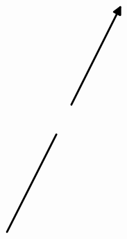 \documentclass[10pt]{article}
\theoremstyle{plain}
\theoremstyle{remark}
\begin{document}
\[\begin{pgfpicture}
\begin{pgfscope}
\pgfpathlineto{\pgfqpoint{3.210150in}{3.618203in}}%
\pgfpathlineto{\pgfqpoint{3.120593in}{3.573710in}}%
\pgfpathclose%
\pgfusepath{stroke,fill}%
\end{pgfscope}%
\begin{pgfscope}%
\pgfpathrectangle{\pgfqpoint{0.224216in}{0.187957in}}{\pgfqpoint{3.754528in}{5.640000in}} %
\pgfusepath{clip}%
\pgfsetroundcap%
\pgfsetroundjoin%
\pgfsetlinewidth{2.007500pt}%
\definecolor{currentstroke}{rgb}{0.000000,0.000000,0.000000}%
\pgfsetstrokecolor{currentstroke}%
\pgfsetdash{}{0pt}%
\pgfpathmoveto{\pgfqpoint{1.313193in}{4.109878in}}%
\pgfpathquadraticcurveto{\pgfqpoint{1.667720in}{4.815670in}}{\pgfqpoint{2.008306in}{5.493710in}}%
\pgfusepath{stroke}%
\end{pgfscope}%
\begin{pgfscope}%
\pgfpathrectangle{\pgfqpoint{0.224216in}{0.187957in}}{\pgfqpoint{3.754528in}{5.640000in}} %
\pgfusepath{clip}%
\pgfsetroundcap%
\pgfsetroundjoin%
\definecolor{currentfill}{rgb}{0.000000,0.000000,0.000000}%
\pgfsetfillcolor{currentfill}%
\pgfsetlinewidth{2.007500pt}%
\definecolor{currentstroke}{rgb}{0.000000,0.000000,0.000000}%
\pgfsetstrokecolor{currentstroke}%
\pgfsetdash{}{0pt}%
\pgfpathmoveto{\pgfqpoint{1.918740in}{5.426793in}}%
\pgfpathlineto{\pgfqpoint{2.008306in}{5.493710in}}%
\pgfpathlineto{\pgfqpoint{2.008100in}{5.381906in}}%
\pgfpathlineto{\pgfqpoint{1.918740in}{5.426793in}}%
\pgfpathclose%
\pgfusepath{stroke,fill}%
\end{pgfscope}%
\begin{pgfscope}%
\pgfpathrectangle{\pgfqpoint{0.224216in}{0.187957in}}{\pgfqpoint{3.754528in}{5.640000in}} %
\pgfusepath{clip}%
\pgfsetroundcap%
\pgfsetroundjoin%
\pgfsetlinewidth{2.007500pt}%
\definecolor{currentstroke}{rgb}{0.000000,0.000000,0.000000}%
\pgfsetstrokecolor{currentstroke}%
\pgfsetdash{}{0pt}%
\pgfpathmoveto{\pgfqpoint{0.396704in}{2.301744in}}%
\pgfpathquadraticcurveto{\pgfqpoint{0.755055in}{3.007951in}}{\pgfqpoint{1.099353in}{3.686462in}}%
\pgfusepath{stroke}%
\end{pgfscope}%
\begin{pgfscope}%
\pgfpathrectangle{\pgfqpoint{0.224216in}{0.187957in}}{\pgfqpoint{3.754528in}{5.640000in}} %
\pgfusepath{clip}%
\pgfsetroundcap%
\pgfsetroundjoin%
\definecolor{currentfill}{rgb}{0.000000,0.000000,0.000000}%
\pgfsetfillcolor{currentfill}%
\pgfsetlinewidth{2.007500pt}%
\definecolor{currentstroke}{rgb}{0.000000,0.000000,0.000000}%
\pgfsetstrokecolor{currentstroke}%
\pgfsetdash{}{0pt}%
\pgfpathmoveto{\pgfqpoint{1.009514in}{3.619912in}}%
\pgfpathlineto{\pgfqpoint{1.099353in}{3.686462in}}%

\end{pgfscope}
\end{pgfpicture}\]
\end{document}
